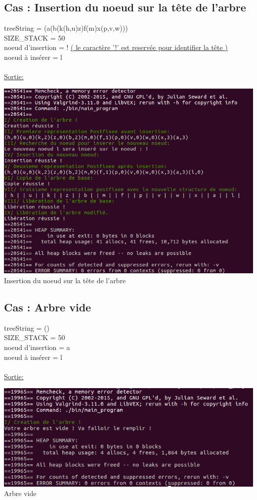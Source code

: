 \documentclass[a4paper]{article}
\begin{document}
\subsection{Cas : Insertion du noeud sur la tête de l'arbre}
treeString = (a(b(k(h,u)z)f(m)x(p,v,w)))
\\ 
SIZE\_STACK = 50
\\
noeud d'insertion = ! \underline{( le caractère '!' est reservée pour  identifier la tête )}
\\
noeud à insérer = l
\\
\\
\underline{Sortie: }
\begin{center}
\includegraphics[scale=0.6]{insertion_tete.png}
\\
Insertion du noeud sur la tête de l'arbre
\end{center}

\subsection{Cas : Arbre vide}
treeString = ()
\\ 
SIZE\_STACK = 50
\\
noeud d'insertion = a
\\
noeud à insérer = l
\\
\\
\underline{Sortie: }
\begin{center}
\includegraphics[scale=0.6]{vide.png}
\\
Arbre vide
\end{center}
\end{document}
